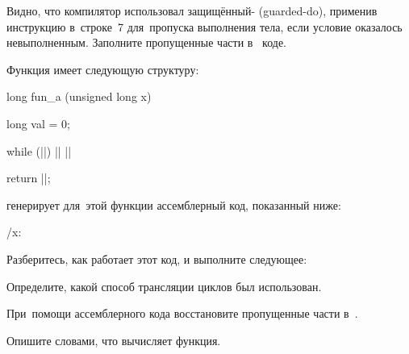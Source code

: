 \noindent Видно, что компилятор использовал защищённый- (\textenglish{guarded-do}), применив инструкцию  в~строке~7 для~пропуска выполнения тела, если условие оказалось невыполненным. Заполните пропущенные части в~ коде.



\WhatToReadSection
\citeauthor[глава~3, стр.~225--242]{Bryant:2022:ru}



\ExercisesSection
\begin{exercise}
\item Функция  имеет следующую структуру:

{\newcommand*{\ans}{\ansdots}%
%
\begin{ccode}
long fun_a (unsigned long x)
{
  long val = 0;

  while (|\ans{x}|)
  {
    |\ans{val \textasciicircum{}= x;}|
    ||
  }

  return |\ans{val & 0x1}|;
}
\end{ccode}
}

\GCC{} генерирует для~этой функции ассемблерный код, показанный ниже:

\precomment/x: %
\vspace{-0.7\baselineskip}

Разберитесь, как работает этот код, и выполните следующее:

\begin{enumIssue}
\item Определите, какой способ трансляции циклов был использован.
\item При~помощи ассемблерного кода восстановите пропущенные части в~.
\item Опишите словами, что вычисляет функция.
\end{enumIssue}

\end{exercise}
